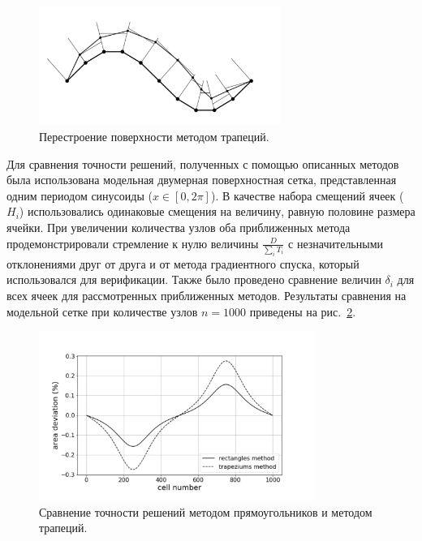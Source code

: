 \begin{figure}[h]
\onelinecaptionstrue
\centering
\includegraphics[width=0.7\textwidth]{pics/text_1_remesh_2d/grid_trapeziums.pdf}
\caption{Перестроение поверхности методом трапеций.}
\label{fig:text_1_remesh_2d_grid_trapeziums}
\end{figure}

Для сравнения точности решений, полученных с помощью описанных методов была использована модельная двумерная поверхностная сетка, представленная одним периодом синусоиды ($x \in [0, 2 \pi]$).
В качестве набора смещений ячеек ($H_i$) использовались одинаковые смещения на величину, равную половине размера ячейки.
При увеличении количества узлов оба приближенных метода продемонстрировали стремление к нулю величины $\frac{D}{\sum_i{T_i}}$ с незначительными отклонениями друг от друга и от метода градиентного спуска, который использовался для верификации.
Также было проведено сравнение величин $\delta_i$ для всех ячеек для рассмотренных приближенных методов.
Результаты сравнения на модельной сетке при количестве узлов $n = 1000$ приведены на рис.~\ref{fig:text_1_remesh_2d_graphic}.

\begin{figure}[h]
\onelinecaptionstrue
\centering
\includegraphics[width=0.8\textwidth]{pics/text_1_remesh_2d/graphic.pdf}
\caption{Сравнение точности решений методом прямоугольников и методом трапеций.}
\label{fig:text_1_remesh_2d_graphic}
\end{figure}

